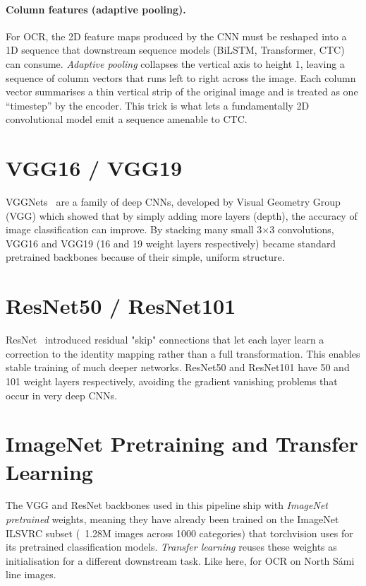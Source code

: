 \paragraph{Column features (adaptive pooling).} For OCR, the 2D feature maps produced by the CNN must be reshaped into a 1D sequence that downstream sequence models (BiLSTM, Transformer, CTC) can consume. \textit{Adaptive pooling} collapses the vertical axis to height 1, leaving a sequence of column vectors that runs left to right across the image. Each column vector summarises a thin vertical strip of the original image and is treated as one ``timestep'' by the encoder. This trick is what lets a fundamentally 2D convolutional model emit a sequence amenable to CTC.

\section{VGG16 / VGG19}
\label{sec:appendix-vgg}

VGGNets~\cite{simonyan2015vgg} are a family of deep CNNs, developed by Visual Geometry Group (VGG) which showed that by simply adding more layers (depth), the accuracy of image classification can improve. By  stacking many small 3$\times$3 convolutions, VGG16 and VGG19 (16 and 19 weight layers respectively) became standard pretrained backbones because of their simple, uniform structure.

\section{ResNet50 / ResNet101}
\label{sec:appendix-resnet}

ResNet~\cite{he2016resnet} introduced residual "skip" connections that let each layer learn a correction to the identity mapping rather than a full transformation. This enables stable training of much deeper networks. ResNet50 and ResNet101 have 50 and 101 weight layers respectively, avoiding the gradient vanishing problems that occur in very deep CNNs.

\section{ImageNet Pretraining and Transfer Learning}
\label{sec:appendix-pretraining}

The VGG and ResNet backbones used in this pipeline ship with \textit{ImageNet pretrained} weights, meaning they have already been trained on the ImageNet ILSVRC subset (~1.28M images across 1000 categories) that torchvision uses for its pretrained classification models. \textit{Transfer learning} reuses these weights as initialisation for a different downstream task. Like here, for OCR on North S\'{a}mi line images.

